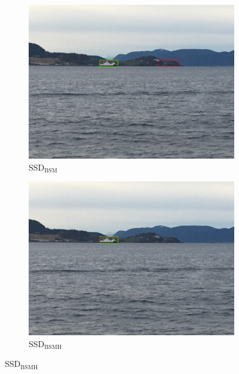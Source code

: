 \begin{figure}[h!]
\begin{subfigure}{.5\textwidth}
  \centering
  \includegraphics[width=0.75\linewidth]{results/case_buildings/ssdtrf/ssd2/grov2/IMG_2285.jpg}
  \caption{SSD$_{\text{BSM}}$}
\end{subfigure}%
\begin{subfigure}{.5\textwidth}
  \centering
  \includegraphics[width=.75\linewidth]{results/case_buildings/ssdtrf/ssd3/grov2/IMG_2285.jpg}
  \caption{SSD$_{\text{BSMH}}$}
\end{subfigure}


\end{figure}
